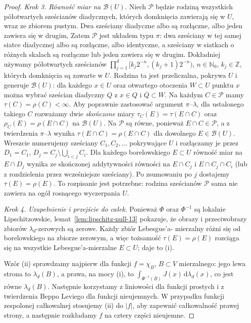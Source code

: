 \documentclass[11pt,a4paper,oneside]{book}
\numberwithin{equation}{chapter}
\theoremstyle{plain}
\theoremstyle{definition}
\theoremstyle{remark}
\begin{document}
\begin{proof}
\emph{Krok 3. Równość miar na $\mathcal B(U)$.}
Niech $\mathcal P$ będzie rodziną wszystkich półotwartych
sześcianów diadycznych, których domknięcia zawierają się
w $U$, wraz ze zbiorem pustym. Dwa sześciany diadyczne
albo są rozłączne, albo jeden zawiera się w drugim,
Zatem $\mathcal P$ jest układem typu $\pi$:
dwa sześciany w tej samej siatce diadycznej albo są
rozłączne, albo identyczne, a sześciany w siatkach
o różnych skalach są rozłączne lub jeden zawiera się
w drugim. Dokładniej używamy półotwartych sześcianów
$\prod_{j=1}^d[k_j2^{-n},(k_j+1)2^{-n})$,
$n\in\mathbb N_0$, $k_j\in\mathbb Z$, których domknięcia
są zawarte w $U$. Rodzina ta jest przeliczalna,
pokrywa $U$ i generuje
$\mathcal B(U)$: dla każdego $x\in U$ oraz otwartego
otoczenia $W\subset U$ punktu $x$ można wybrać
sześcian diadyczny $Q$ z $x\in Q$ i $\overline Q\subset W$.
Na każdym $C\in\mathcal P$ mamy
$\tau(C)=\rho(C)<\infty$. Aby poprawnie zastosować
argument $\pi$--$\lambda$, dla ustalonego takiego $C$
rozważamy dwie \emph{skończone} miary
$\tau_C(E)=\tau(E\cap C)$ oraz
$\rho_C(E)=\rho(E\cap C)$ na $\mathcal B(U)$.
Na $\mathcal P$ są równe, ponieważ $E\cap C\in\mathcal P$,
a z twierdzenia $\pi$--$\lambda$ wynika
$\tau(E\cap C)=\rho(E\cap C)$ dla dowolnego
$E\in\mathcal B(U)$. Wreszcie numerujemy sześciany
$C_1,C_2,\dots$ pokrywające $U$ i rozłączamy je przez
$D_1=C_1$, $D_j=C_j\setminus\bigcup_{i<j}C_i$.
Dla każdego borelowskiego $E\subset U$ równość miar
na $E\cap D_j$ wynika ze skończonej addytywności
równości na $E\cap C_j$ i $E\cap C_j\cap C_i$
(lub z rozdzielenia przez wcześniejsze sześciany).
Po zsumowaniu po $j$ dostajemy
$\tau(E)=\rho(E)$. To rozpisanie jest potrzebne:
rodzina sześcianów $\mathcal P$ sama nie zawiera
na ogół rosnącego wyczerpania $U$.

\emph{Krok 4. Uzupełnienie i przejście do całek.}
Ponieważ $\Phi$ oraz $\Phi^{-1}$ są lokalnie
Lipschitzowskie, lemat~\ref{lem:lipschitz-null-13}
pokazuje, że obrazy i przeciwobrazy zbiorów
$\lambda_d$-zerowych są zerowe. Każdy zbiór Lebesgue'a-
mierzalny różni się od borelowskiego na zbiorze zerowym,
a więc tożsamość $\tau(E)=\rho(E)$ rozciąga się na
wszystkie Lebesgue'a-mierzalne $E\subset U$; daje to (i).

Wzór (ii) sprawdzamy najpierw dla funkcji $f=\chi_B$,
$B\subset V$ mierzalnego: jego lewa strona to
$\lambda_d(B)$, a prawa, na mocy (i), to
$\int_{\Phi^{-1}(B)}J(x)\,\mathrm d\lambda_d(x)$,
co jest równe $\lambda_d(B)$.
Następnie korzystamy z liniowości dla funkcji prostych
i z twierdzenia Beppo Leviego dla funkcji nieujemnych.
W przypadku funkcji zespolonej całkowalnej stosujemy
(ii) do $|f|$, aby zapewnić całkowalność prawej strony,
a następnie rozkładamy $f$ na cztery części nieujemne.
\end{proof}
\end{document}
